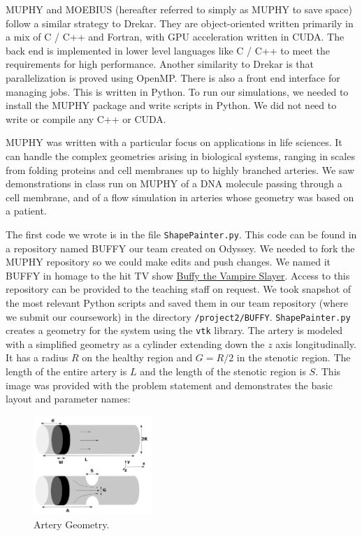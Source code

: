 \documentclass[11pt]{article} %
\newcommand{\tty}[1]{\texttt{#1}}
\begin{document}
MUPHY and MOEBIUS (hereafter referred to simply as MUPHY to save space) follow a similar strategy to Drekar.  
They are object-oriented written primarily in a mix of C / C++ and Fortran, with GPU acceleration written in CUDA.
The back end is implemented in lower level languages like C / C++  to meet the requirements for high performance.
Another similarity to Drekar is that parallelization is proved using OpenMP.
There is also a front end interface for managing jobs.  This is written in Python.
To run our simulations, we needed to install the MUPHY package and write
scripts in Python.  We did not need to write or compile any C++ or CUDA.

MUPHY was written with a particular focus on applications in life sciences.
It can handle the complex geometries arising in biological systems, ranging in scales
from folding proteins and cell membranes up to highly branched arteries.
We saw demonstrations in class run on MUPHY of a DNA molecule passing through
a cell membrane, and of a flow simulation in arteries whose geometry was
based on a patient.

The first code we wrote is in the file \tty{ShapePainter.py}.
This code can be found in a repository named BUFFY our team created on Odyssey.
We needed to fork the MUPHY repository so we could make edits and push changes.
We named it BUFFY in homage to the hit TV show 
\href{https://en.wikipedia.org/wiki/Buffy_the_Vampire_Slayer}{Buffy the Vampire Slayer}.
Access to this repository can be provided to the teaching staff on request.
We took snapshot of the most relevant Python scripts and saved them in our
team repository (where we submit our coursework) in the directory \tty{/project2/BUFFY}.
\tty{ShapePainter.py} creates a geometry for the system using the \tty{vtk} library.
The artery is modeled with a simplified geometry 
as a cylinder extending down the $z$ axis longitudinally.
It has a radius $R$ on the healthy region and $G=R/2$ in the stenotic region.
The length of the entire artery is $L$ and the length of the stenotic region is $S$.
This image was provided with the problem statement and demonstrates
the basic layout and parameter names:
\begin{figure}[h!]
\centering
\includegraphics[width=0.40\textwidth]{artery_geometry.png}
\caption{Artery Geometry.}
\end{figure}
\end{document}
